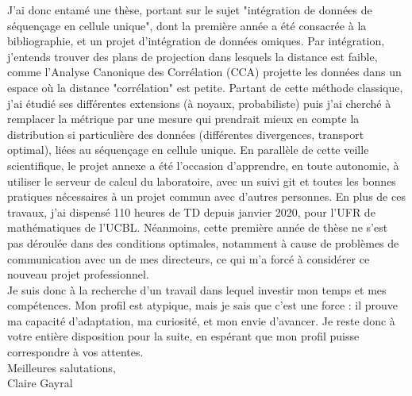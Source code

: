 \documentclass[a4paper,11pt]{article}
\begin{document}
J'ai donc entamé une thèse, portant sur le sujet "intégration de données de séquençage en cellule unique", dont la première année a été consacrée à la bibliographie, et un projet d'intégration de données omiques. 
%
Par intégration, j'entends trouver des plans de projection dans lesquels la distance est faible, comme l'Analyse Canonique des Corrélation (CCA) projette les données dans un espace où la distance "corrélation" est petite. Partant de cette méthode classique, j'ai étudié ses différentes extensions (à noyaux, probabiliste) puis j'ai cherché à remplacer la métrique par une mesure qui prendrait mieux en compte la distribution si particulière des données (différentes divergences, transport optimal), liées au séquençage en cellule unique. 
En parallèle de cette veille scientifique, le projet annexe a été l'occasion d'apprendre, en toute autonomie, à utiliser le serveur de calcul du laboratoire, avec un suivi git et toutes les bonnes pratiques nécessaires à un projet commun avec d'autres personnes.
En plus de ces travaux, j'ai dispensé 110 heures de TD depuis janvier 2020, pour l'UFR de mathématiques de l'UCBL. 
Néanmoins, cette première année de thèse ne s'est pas déroulée dans des conditions optimales, notamment à cause de problèmes de communication avec un de mes directeurs, ce qui m'a forcé à considérer ce nouveau projet professionnel.\\ 

Je suis donc à la recherche d'un travail dans lequel investir mon temps et mes compétences. Mon profil est atypique, mais je sais que c'est une force : il prouve ma capacité d'adaptation, ma curiosité, et mon envie d'avancer. 
%
Je reste donc à votre entière disposition pour la suite, en espérant que mon profil puisse correspondre à vos attentes. \\

Meilleures salutations, \\

Claire Gayral
\end{document}
